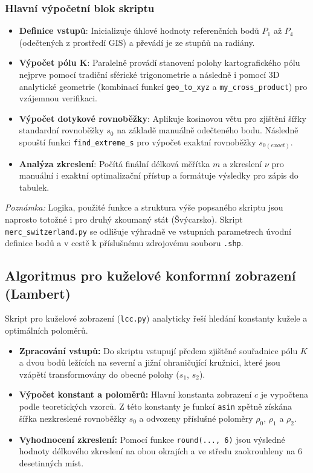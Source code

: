 \documentclass[12pt, a4paper]{article}
\begin{document}
\subsubsection{Hlavní výpočetní blok skriptu}

\begin{itemize}
    \item \textbf{Definice vstupů}: Inicializuje úhlové hodnoty referenčních bodů $P_1$ až $P_4$ (odečtených z prostředí GIS) a převádí je ze stupňů na radiány.
    
    \item \textbf{Výpočet pólu K}: Paralelně provádí stanovení polohy kartografického pólu nejprve pomocí tradiční sférické trigonometrie a následně i pomocí 3D analytické geometrie (kombinací funkcí \texttt{geo\_to\_xyz} a \texttt{my\_cross\_product}) pro vzájemnou verifikaci.
    
    \item \textbf{Výpočet dotykové rovnoběžky}: Aplikuje kosinovou větu pro zjištění šířky standardní rovnoběžky $s_0$ na základě manuálně odečteného bodu. Následně spouští funkci \texttt{find\_extreme\_s} pro výpočet exaktní rovnoběžky $s_{0(exact)}$.
    
    \item \textbf{Analýza zkreslení}: Počítá finální délková měřítka $m$ a zkreslení $\nu$ pro manuální i exaktní optimalizační přístup a formátuje výsledky pro zápis do tabulek.
\end{itemize}

\vspace{0.5cm}
\noindent \textit{Poznámka:} Logika, použité funkce a struktura výše popsaného skriptu jsou naprosto totožné i pro druhý zkoumaný stát (Švýcarsko). Skript \texttt{merc\_switzerland.py} se odlišuje výhradně ve vstupních parametrech úvodní definice bodů a v cestě k příslušnému zdrojovému souboru \texttt{.shp}.

\subsection{Algoritmus pro kuželové konformní zobrazení (Lambert)}

Skript pro kuželové zobrazení (\texttt{lcc.py}) analyticky řeší hledání konstanty kužele a optimálních poloměrů.
\begin{itemize}
    \item \textbf{Zpracování vstupů:} Do skriptu vstupují předem zjištěné souřadnice pólu $K$ a dvou bodů ležících na severní a jižní ohraničující kružnici, které jsou vzápětí transformovány do obecné polohy ($s_1$, $s_2$).
    \item \textbf{Výpočet konstant a poloměrů:} Hlavní konstanta zobrazení $c$ je vypočtena podle teoretických vzorců. Z této konstanty je funkcí \texttt{asin} zpětně získána šířka nezkreslené rovnoběžky $s_0$ a odvozeny příslušné poloměry $\rho_0$, $\rho_1$ a $\rho_2$.
    \item \textbf{Vyhodnocení zkreslení:} Pomocí funkce \texttt{round(..., 6)} jsou výsledné hodnoty délkového zkreslení na obou okrajích a ve středu zaokrouhleny na 6 desetinných míst.
\end{itemize}
\end{document}
